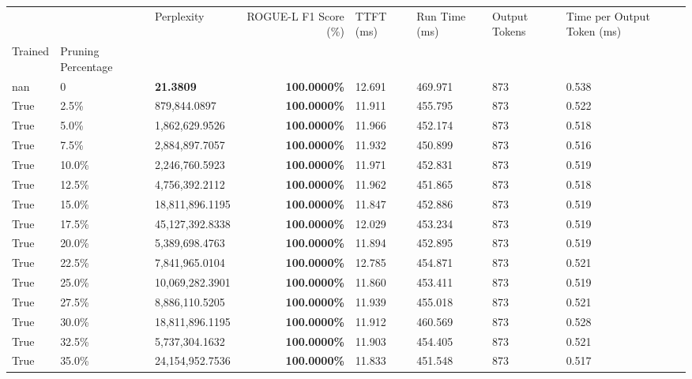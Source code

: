 \begin{table}[H]
{\label{tab:evaluation-pipeline-6-trained}
\begin{tabular}{lllrllll}
\toprule
 &  & Perplexity & ROGUE-L F1 Score (\%) & TTFT (ms) & Run Time (ms) & Output Tokens & Time per Output Token (ms) \\
Trained & Pruning Percentage &  &  &  &  &  &  \\
\midrule
nan & 0 & \bfseries 21.3809 & \bfseries 100.0000\% & 12.691 & 469.971 & 873 & 0.538 \\
\cline{1-8}
True & 2.5\% & 879,844.0897 & \bfseries \color{red} 100.0000\% & 11.911 & 455.795 & 873 & 0.522 \\
\cline{1-8}
True & 5.0\% & 1,862,629.9526 & \bfseries \color{red} 100.0000\% & 11.966 & 452.174 & 873 & 0.518 \\
\cline{1-8}
True & 7.5\% & 2,884,897.7057 & \bfseries \color{red} 100.0000\% & 11.932 & 450.899 & 873 & 0.516 \\
\cline{1-8}
True & 10.0\% & 2,246,760.5923 & \bfseries \color{red} 100.0000\% & 11.971 & 452.831 & 873 & 0.519 \\
\cline{1-8}
True & 12.5\% & 4,756,392.2112 & \bfseries \color{red} 100.0000\% & 11.962 & 451.865 & 873 & 0.518 \\
\cline{1-8}
True & 15.0\% & 18,811,896.1195 & \bfseries \color{red} 100.0000\% & 11.847 & 452.886 & 873 & 0.519 \\
\cline{1-8}
True & 17.5\% & 45,127,392.8338 & \bfseries \color{red} 100.0000\% & 12.029 & 453.234 & 873 & 0.519 \\
\cline{1-8}
True & 20.0\% & 5,389,698.4763 & \bfseries \color{red} 100.0000\% & 11.894 & 452.895 & 873 & 0.519 \\
\cline{1-8}
True & 22.5\% & 7,841,965.0104 & \bfseries \color{red} 100.0000\% & 12.785 & 454.871 & 873 & 0.521 \\
\cline{1-8}
True & 25.0\% & 10,069,282.3901 & \bfseries \color{red} 100.0000\% & 11.860 & 453.411 & 873 & 0.519 \\
\cline{1-8}
True & 27.5\% & 8,886,110.5205 & \bfseries \color{red} 100.0000\% & 11.939 & 455.018 & 873 & 0.521 \\
\cline{1-8}
True & 30.0\% & 18,811,896.1195 & \bfseries \color{red} 100.0000\% & 11.912 & 460.569 & 873 & 0.528 \\
\cline{1-8}
True & 32.5\% & 5,737,304.1632 & \bfseries \color{red} 100.0000\% & 11.903 & 454.405 & 873 & 0.521 \\
\cline{1-8}
True & 35.0\% & 24,154,952.7536 & \bfseries \color{red} 100.0000\% & 11.833 & 451.548 & 873 & 0.517 \\

\end{tabular}}
\end{table}
